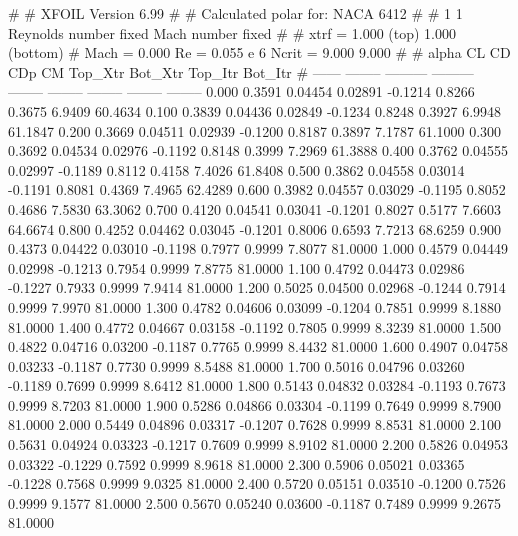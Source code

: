 #  
#       XFOIL         Version 6.99
#  
# Calculated polar for: NACA 6412                                       
#  
# 1 1 Reynolds number fixed          Mach number fixed         
#  
# xtrf =   1.000 (top)        1.000 (bottom)  
# Mach =   0.000     Re =     0.055 e 6     Ncrit =   9.000  9.000
#  
#   alpha    CL        CD       CDp       CM     Top_Xtr  Bot_Xtr  Top_Itr  Bot_Itr
#  ------ -------- --------- --------- -------- -------- -------- -------- --------
   0.000   0.3591   0.04454   0.02891  -0.1214   0.8266   0.3675   6.9409  60.4634
   0.100   0.3839   0.04436   0.02849  -0.1234   0.8248   0.3927   6.9948  61.1847
   0.200   0.3669   0.04511   0.02939  -0.1200   0.8187   0.3897   7.1787  61.1000
   0.300   0.3692   0.04534   0.02976  -0.1192   0.8148   0.3999   7.2969  61.3888
   0.400   0.3762   0.04555   0.02997  -0.1189   0.8112   0.4158   7.4026  61.8408
   0.500   0.3862   0.04558   0.03014  -0.1191   0.8081   0.4369   7.4965  62.4289
   0.600   0.3982   0.04557   0.03029  -0.1195   0.8052   0.4686   7.5830  63.3062
   0.700   0.4120   0.04541   0.03041  -0.1201   0.8027   0.5177   7.6603  64.6674
   0.800   0.4252   0.04462   0.03045  -0.1201   0.8006   0.6593   7.7213  68.6259
   0.900   0.4373   0.04422   0.03010  -0.1198   0.7977   0.9999   7.8077  81.0000
   1.000   0.4579   0.04449   0.02998  -0.1213   0.7954   0.9999   7.8775  81.0000
   1.100   0.4792   0.04473   0.02986  -0.1227   0.7933   0.9999   7.9414  81.0000
   1.200   0.5025   0.04500   0.02968  -0.1244   0.7914   0.9999   7.9970  81.0000
   1.300   0.4782   0.04606   0.03099  -0.1204   0.7851   0.9999   8.1880  81.0000
   1.400   0.4772   0.04667   0.03158  -0.1192   0.7805   0.9999   8.3239  81.0000
   1.500   0.4822   0.04716   0.03200  -0.1187   0.7765   0.9999   8.4432  81.0000
   1.600   0.4907   0.04758   0.03233  -0.1187   0.7730   0.9999   8.5488  81.0000
   1.700   0.5016   0.04796   0.03260  -0.1189   0.7699   0.9999   8.6412  81.0000
   1.800   0.5143   0.04832   0.03284  -0.1193   0.7673   0.9999   8.7203  81.0000
   1.900   0.5286   0.04866   0.03304  -0.1199   0.7649   0.9999   8.7900  81.0000
   2.000   0.5449   0.04896   0.03317  -0.1207   0.7628   0.9999   8.8531  81.0000
   2.100   0.5631   0.04924   0.03323  -0.1217   0.7609   0.9999   8.9102  81.0000
   2.200   0.5826   0.04953   0.03322  -0.1229   0.7592   0.9999   8.9618  81.0000
   2.300   0.5906   0.05021   0.03365  -0.1228   0.7568   0.9999   9.0325  81.0000
   2.400   0.5720   0.05151   0.03510  -0.1200   0.7526   0.9999   9.1577  81.0000
   2.500   0.5670   0.05240   0.03600  -0.1187   0.7489   0.9999   9.2675  81.0000
